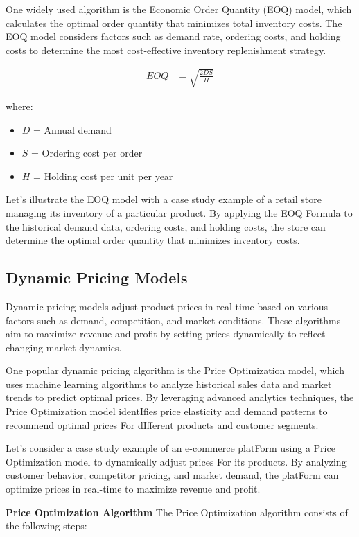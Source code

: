 \documentclass[12pt]{book} %
\begin{document}
One widely used algorithm is the Economic Order Quantity (EOQ) model, which calculates the optimal order quantity that minimizes total inventory costs. The EOQ model considers factors such as demand rate, ordering costs, and holding costs to determine the most cost-effective inventory replenishment strategy.

\begin{align*}
    EOQ &= \sqrt{\frac{2DS}{H}}
\end{align*}

where:
\begin{itemize}
    \item $D$ = Annual demand
    \item $S$ = Ordering cost per order
    \item $H$ = Holding cost per unit per year
\end{itemize}

Let's illustrate the EOQ model with a case study example of a retail store managing its inventory of a particular product. By applying the EOQ Formula to the historical demand data, ordering costs, and holding costs, the store can determine the optimal order quantity that minimizes inventory costs.

\subsection{Dynamic Pricing Models}
Dynamic pricing models adjust product prices in real-time based on various factors such as demand, competition, and market conditions. These algorithms aim to maximize revenue and profit by setting prices dynamically to reflect changing market dynamics.

One popular dynamic pricing algorithm is the Price Optimization model, which uses machine learning algorithms to analyze historical sales data and market trends to predict optimal prices. By leveraging advanced analytics techniques, the Price Optimization model identIfies price elasticity and demand patterns to recommend optimal prices For dIfferent products and customer segments.

Let's consider a case study example of an e-commerce platForm using a Price Optimization model to dynamically adjust prices For its products. By analyzing customer behavior, competitor pricing, and market demand, the platForm can optimize prices in real-time to maximize revenue and profit.

\textbf{Price Optimization Algorithm}
The Price Optimization algorithm consists of the following steps:
\end{document}
